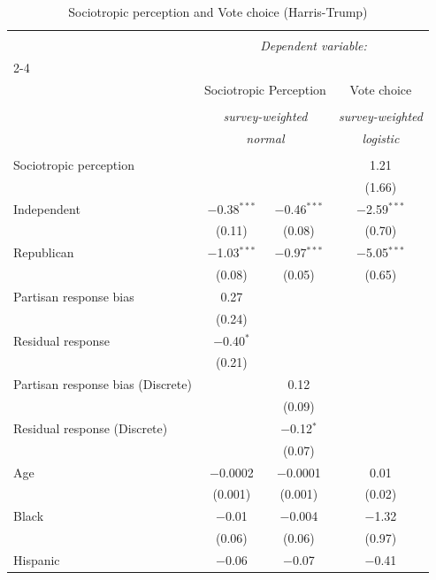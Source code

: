 \documentclass{article}\usepackage[]{graphicx}\usepackage[]{xcolor}
\begin{document}
\begin{table}[H]
\centering
\caption{Sociotropic perception and Vote choice (Harris-Trump)}

\begingroup 
\small 
\begin{tabular}{@{\extracolsep{5pt}}lccc} 
\\[-1.8ex]\hline 
\hline \\[-1.8ex] 
 & \multicolumn{3}{c}{\textit{Dependent variable:}} \\ 
\cline{2-4} 
\\[-1.8ex] & \multicolumn{2}{c}{Sociotropic Perception} & Vote choice \\ 
\\[-1.8ex] & \multicolumn{2}{c}{\textit{survey-weighted}} & \textit{survey-weighted} \\ 
 & \multicolumn{2}{c}{\textit{normal}} & \textit{logistic} \\ 
\hline \\[-1.8ex] 
 Sociotropic perception &  &  & 1.21 \\ 
  &  &  & (1.66) \\ 
  Independent & $-$0.38$^{***}$ & $-$0.46$^{***}$ & $-$2.59$^{***}$ \\ 
  & (0.11) & (0.08) & (0.70) \\ 
  Republican & $-$1.03$^{***}$ & $-$0.97$^{***}$ & $-$5.05$^{***}$ \\ 
  & (0.08) & (0.05) & (0.65) \\ 
  Partisan response bias & 0.27 &  &  \\ 
  & (0.24) &  &  \\ 
  Residual response & $-$0.40$^{*}$ &  &  \\ 
  & (0.21) &  &  \\ 
  Partisan response bias (Discrete) &  & 0.12 &  \\ 
  &  & (0.09) &  \\ 
  Residual response (Discrete) &  & $-$0.12$^{*}$ &  \\ 
  &  & (0.07) &  \\ 
  Age & $-$0.0002 & $-$0.0001 & 0.01 \\ 
  & (0.001) & (0.001) & (0.02) \\ 
  Black & $-$0.01 & $-$0.004 & $-$1.32 \\ 
  & (0.06) & (0.06) & (0.97) \\ 
  Hispanic & $-$0.06 & $-$0.07 & $-$0.41 \\ 

\end{tabular}
\end{table}
\end{document}
